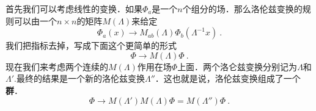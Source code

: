 首先我们可以考虑线性的变换．如果$\Phi_a$是一个$n$个组分的场．那么洛伦兹变换的规则可以由一个$n\times n$的矩阵$M(\Lambda)$来给定
\begin{equation}
\Phi_a (x) \rightarrow M_{ab} (\Lambda) \Phi_b(\Lambda^{-1} x)~.
\end{equation}
我们把指标去掉，写成下面这个更简单的形式
\begin{equation}
\Phi\rightarrow M(\Lambda)\Phi~.
\end{equation}
现在我们来考虑两个连续的$M(\Lambda)$作用在场$\Phi$上面．两个洛仑兹变换分别记为$\Lambda$和$\Lambda'$.最终的结果是一个新的洛伦兹变换$\Lambda''$．这也就是说，洛伦兹变换组成了一个\textbf{群}．
\begin{equation}
\Phi\rightarrow M(\Lambda')M(\Lambda)\Phi = M(\Lambda'')\Phi~.
\end{equation}

